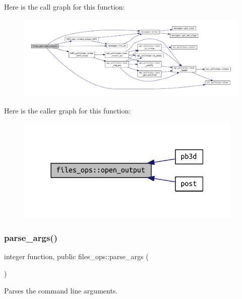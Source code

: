 Here is the call graph for this function\+:\nopagebreak
\begin{figure}[H]
\begin{center}
\leavevmode
\includegraphics[width=350pt]{namespacefiles__ops_ad681a9e8083a6f664cf0f9d17ebe279c_cgraph}
\end{center}
\end{figure}
Here is the caller graph for this function\+:\nopagebreak
\begin{figure}[H]
\begin{center}
\leavevmode
\includegraphics[width=306pt]{namespacefiles__ops_ad681a9e8083a6f664cf0f9d17ebe279c_icgraph}
\end{center}
\end{figure}
\mbox{\label{namespacefiles__ops_a051584112f6e4f6e60b0ef824dffbf5e}} 
\subsubsection{\texorpdfstring{parse\+\_\+args()}{parse\_args()}}
{\footnotesize\ttfamily integer function, public files\+\_\+ops\+::parse\+\_\+args (\begin{DoxyParamCaption}{ }\end{DoxyParamCaption})}



Parses the command line arguments. 

